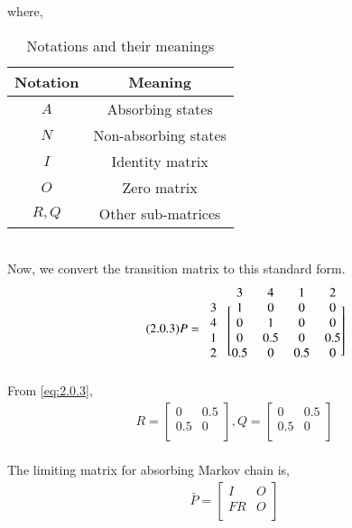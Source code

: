 \documentclass[journal,12pt,twocolumn]{IEEEtran}
\begin{document}
where,
\begin{table}[h!]
\centering
\caption{Notations and their meanings}
\label{table:2}
\begin{tabular}{|c|c|}
    \hline
    Notation & Meaning \\
    \hline
    $A$ & Absorbing states\\[1ex]
    \hline
    $N$ & Non-absorbing states\\[1ex]
    \hline
    $I$ & Identity matrix\\[1ex]
    \hline
    $O$ & Zero matrix\\[1ex]
    \hline
    $R,Q$ & Other sub-matrices\\[1ex]
    \hline
\end{tabular}
\end{table}
\\Now, we convert the transition matrix to this standard form.
\begin{align}
\tag{2.0.3}
\label{eq:2.0.3}
    P = \begin{blockarray}{ccccc}
    &3 &4 &1 &2\\
    \begin{block}{c[cccc]}
    3 & 1 & 0 & 0 & 0 \\
    4 & 0 & 1 & 0 & 0 \\
    1 & 0 & 0.5 & 0 & 0.5 \\
    2 & 0.5 & 0 & 0.5 & 0 \\
    \end{block}
    \end{blockarray}
\end{align}
From \eqref{eq:2.0.3}, 
\begin{align}
    \tag{2.0.4}
    \label{eq:2.0.4}
    R = \begin{bmatrix}
    0 & 0.5\\
    0.5 & 0\\
    \end{bmatrix}
    , Q = \begin{bmatrix}
    0 & 0.5\\
    0.5 & 0\\
    \end{bmatrix}
\end{align}
\\The limiting matrix for absorbing Markov chain is,
\begin{align}
\tag{2.0.5}
\label{eq:2.0.5}
    \bar P=\begin{bmatrix}
    I & O\\
    FR & O\\
    \end{bmatrix}
\end{align}
\end{document}
